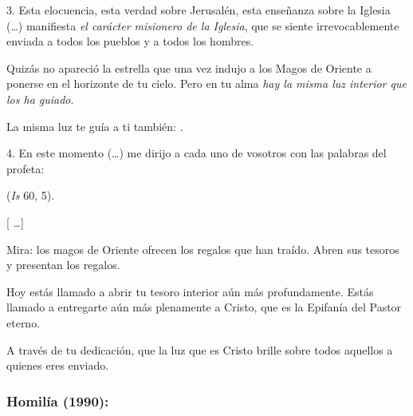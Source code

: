 \begin{body}
					3. Esta elocuencia, esta verdad sobre Jerusalén, esta enseñanza sobre la Iglesia (\ldots{}) manifiesta \emph{el carácter misionero de la Iglesia}, que se siente irrevocablemente enviada a todos los pueblos y a todos los hombres.
					
					Quizás no apareció la estrella que una vez indujo a los Magos de Oriente a ponerse en el horizonte de tu cielo. Pero en tu alma \emph{hay la misma luz interior que los ha guiado}.
					
					La misma luz te guía a ti también: .
					
					4. En este momento (\ldots{}) me dirijo a cada uno de vosotros con las palabras del profeta:
					
					 (\emph{Is} 60, 5).
					
					{[} \ldots{}{]}
					
					Mira: los magos de Oriente ofrecen los regalos que han traído. Abren sus tesoros y presentan los regalos.
					
					Hoy estás llamado a abrir tu tesoro interior aún más profundamente. Estás llamado a entregarte aún más plenamente a Cristo, que es la Epifanía del Pastor eterno.
					
					A través de tu dedicación, que la luz que es Cristo brille sobre todos aquellos a quienes eres enviado.
				\end{body}
			
			
			\subsubsection{Homilía (1990):}
			
				
